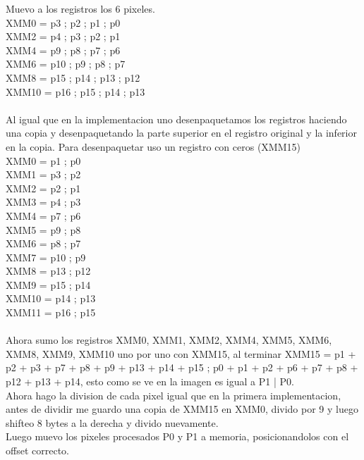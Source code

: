 Muevo a los registros los 6 pixeles. \\
	XMM0 = p3 ; p2 ; p1 ; p0 \\
	XMM2 = p4 ; p3 ; p2 ; p1 \\
	XMM4 = p9 ; p8 ; p7 ; p6 \\
	XMM6 = p10 ; p9 ; p8 ; p7 \\
	XMM8 = p15 ; p14 ; p13 ; p12 \\
	XMM10 = p16 ; p15 ; p14 ; p13 \\
\\
Al igual que en la implementacion uno desenpaquetamos los registros haciendo una copia y desenpaquetando la parte superior en el registro original y la inferior en la copia. Para desenpaquetar uso un registro con ceros (XMM15) \\
	XMM0 = p1 ; p0 \\
 	XMM1 = p3 ; p2 \\
 	XMM2 = p2 ; p1 \\
	XMM3 = p4 ; p3 \\ 
	XMM4 = p7 ; p6 \\
	XMM5 = p9 ; p8 \\
	XMM6 = p8 ; p7 \\
 	XMM7 = p10 ; p9 \\
 	XMM8 = p13 ; p12 \\
	XMM9 = p15 ; p14 \\ 
	XMM10 = p14 ; p13 \\
	XMM11 = p16 ; p15 \\
\\
Ahora sumo los registros XMM0, XMM1, XMM2, XMM4, XMM5, XMM6, XMM8, XMM9, XMM10 uno por uno con XMM15, al terminar XMM15 = p1 + p2 + p3 + p7 + p8 + p9 + p13 + p14 + p15 ; p0 + p1 + p2 + p6 + p7 + p8 + p12 + p13 + p14, esto como se ve en la imagen es igual a P1 | P0. \\

Ahora hago la division de cada pixel igual que en la primera implementacion, antes de dividir me guardo una copia de XMM15 en XMM0, divido por 9 y luego shifteo 8 bytes a la derecha y divido nuevamente. \\

Luego muevo los pixeles procesados P0 y P1 a memoria, posicionandolos con el offset correcto. \\

